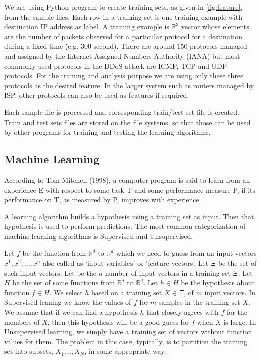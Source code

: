 \documentclass[12pt,oneside,a4paper]{article}
\begin{document}
We are using Python program to create training sets, as given in \ref{fig:feature}, from the sample files. Each row in a training set is one training example with destination IP address as label. A training example is $\mathbb{R}^3$ vector whose elements are the number of packets observed for a particular protocol for a destination during a fixed time (e.g. 300 second). There are around 150 protocols managed and assigned by the Internet Assigned Numbers Authority (IANA) but most commonly used protocols in the DDoS attack are ICMP, TCP and UDP protocols. For the training and analysis purpose we are using only these three protocols as the desired feature. In the larger system such as routers managed by ISP, other protocols can also be used as features if required.

Each sample file is processed and corresponding train/test set file is created. Train and test sets files are stored on the file systems, so that those can be used by other programs for training and testing the learning algorithms.

\subsection{Machine Learning}

According to Tom Mitchell (1998), a computer program is said to learn from an experience E with respect to some task T and some performance measure P, if its performance on T, as measured by P, improves with experience.

A learning algorithm builds a hypothesis using a training set as input. Then that hypothesis is used to perform predictions. The most common categorization of machine learning algorithms is Supervised and Unsupervised.

Let $f$ be the function from $\mathbb{R}^d$ to $\mathbb{R}^d$ which we need to guess from an input vectors $x^{1}, x^{2}, ..., x^{n}$ also called as `input variables' or `feature vectors'. Let $\Xi$ be the set of such input vectors. Let be the $n$ number of input vectors in a training set $\Xi$. Let $H$ be the set of some functions from $\mathbb{R}^d$ to $\mathbb{R}^d$. Let $h \in H$ be the hypothesis about function $f \in H$. We select $h$ based on a training set $X \in \Xi$, of $m$ input vectors. In Supervised leaning we know the values of $f$ for $m$ samples in the training set $X$. We assume that if we can find a hypothesis $h$ that closely agrees with $f$ for the members of $X$, then this hypothesis will be a good guess for $f$ when $X$ is large. In Unsupervised learning, we simply have a training set of vectors without function values for them. The problem in this case, typically, is to partition the training set into subsets, $X_1,.. ,X_{N}$, in some appropriate way.\cite{machine-learning}
\end{document}
